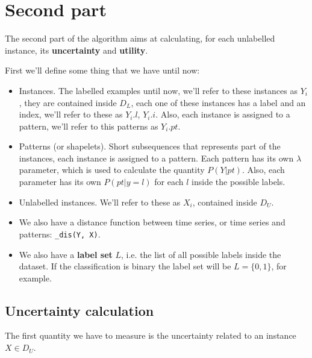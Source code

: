 \section{Second part}
The second part of the algorithm aims at calculating, for each unlabelled instance,
its \textbf{uncertainty} and \textbf{utility}.

First we'll define some thing that we have until now:
\begin{itemize}
    \item Instances. The labelled examples until now, we'll refer to these instances as $Y_i$, they are
    contained inside $D_L$, each one of these instances has a label and an index, we'll refer to these as 
    $Y_i.l$, $Y_i.i$. Also, each instance is assigned to a pattern, we'll refer to this patterns as $Y_i.pt$.
    \item Patterns (or shapelets). Short subsequences that represents part of the instances, each instance is 
    assigned to a pattern. Each pattern has its own $\lambda$ parameter, which is used to calculate the
    quantity $P(Y | pt)$. Also, each parameter has its own $P(pt|y = l)$ for each $l$ inside the possible labels.
    \item Unlabelled instances. We'll refer to these as $X_i$, contained inside $D_U$.
    \item We also have a distance function between time series, or time series and patterns: \texttt{\_dis(Y, X)}.
    \item We also have a \textbf{label set} $L$, i.e. the list of all possible labels inside the dataset. 
    If the classification is binary the label set will be $L = \{0, 1\}$, for example.
\end{itemize}

\subsection{Uncertainty calculation}
The first quantity we have to measure is the uncertainty related to an instance $X \in D_U$.

